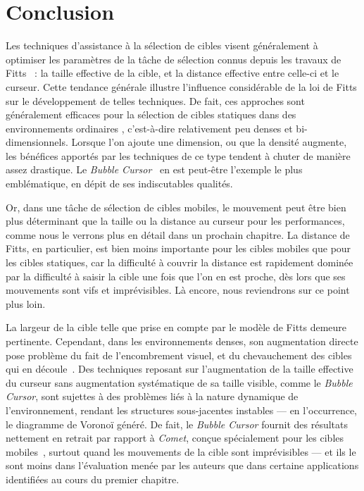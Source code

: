 \section{Conclusion}
    Les techniques d'assistance à la sélection de cibles visent généralement à optimiser les paramètres de la tâche de sélection connus depuis les travaux de Fitts~\cite{fitts1954information} : la taille effective de la cible, et la distance effective entre celle-ci et le curseur. Cette tendance générale illustre l'influence considérable de la loi de Fitts sur le développement de telles techniques. De fait, ces approches sont généralement efficaces pour la sélection de cibles statiques dans des environnements \og ordinaires \fg{}, c'est-à-dire relativement peu denses et bi-dimensionnels. Lorsque l'on ajoute une dimension, ou que la densité augmente, les bénéfices apportés par les techniques de ce type tendent à chuter de manière assez drastique. Le \emph{Bubble Cursor}~\cite{grossman2005bubble} en est peut-être l'exemple le plus emblématique, en dépit de ses indiscutables qualités.
    
    Or, dans une tâche de sélection de cibles mobiles, le mouvement peut être bien plus déterminant que la taille ou la distance au curseur pour les performances, comme nous le verrons plus en détail dans un prochain chapitre. La distance de Fitts, en particulier, est bien moins importante pour les cibles mobiles que pour les cibles statiques, car la difficulté à couvrir la distance est rapidement dominée par la difficulté à saisir la cible une fois que l'on en est proche, dès lors que ses mouvements sont vifs et imprévisibles. Là encore, nous reviendrons sur ce point plus loin.
    
    La largeur de la cible telle que prise en compte par le modèle de Fitts demeure pertinente. Cependant, dans les environnements denses, son augmentation directe pose problème du fait de l'encombrement visuel, et du chevauchement des cibles qui en découle~\cite{mcguffin2002acquisition}. Des techniques reposant sur l'augmentation de la taille effective du curseur sans augmentation systématique de sa taille visible, comme le \emph{Bubble Cursor}, sont sujettes à des problèmes liés à la nature dynamique de l'environnement, rendant les structures sous-jacentes instables --- en l'occurrence, le diagramme de Voronoï généré. De fait, le \emph{Bubble Cursor} fournit des résultats nettement en retrait par rapport à \emph{Comet}, conçue spécialement pour les cibles mobiles~\cite{hasan2011comet}, surtout quand les mouvements de la cible sont imprévisibles --- et ils le sont moins dans l'évaluation menée par les auteurs que dans certaine applications identifiées au cours du premier chapitre.
    
